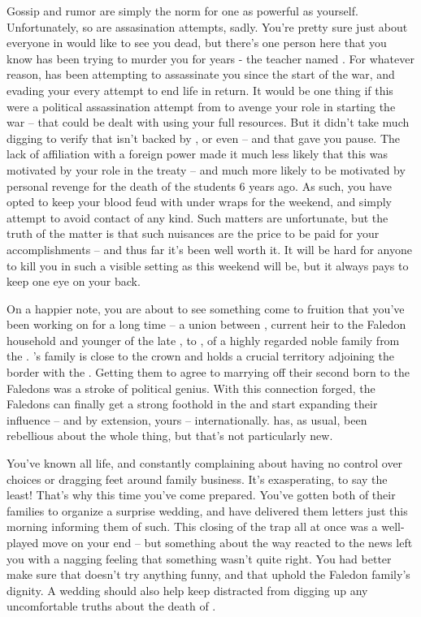\documentclass[char]{GL2020}
\begin{document}
Gossip and rumor are simply the norm for one as powerful as yourself. Unfortunately, so are assasination attempts, sadly. You’re pretty sure just about everyone in \pShip{} would like to see you dead, but there’s one person here that you know has been trying to murder you for years - the teacher named \cChupAvenger{}. For whatever reason, \cChupAvenger{} has been attempting to assassinate you since the start of the war, and evading your every attempt to end \cChupAvenger{\their} life in return. It would be one thing if this were a political assassination attempt from \pShip{} to avenge your role in starting the war -- that could be dealt with using your full resources. But it didn’t take much digging to verify that \cChupAvenger{} isn’t backed by \pShip{}, or even \pFarm{} -- and that gave you pause. The lack of affiliation with a foreign power made it much less likely that this was motivated by your role in the treaty -- and much more likely to be motivated by personal revenge for the death of the students 6 years ago. As such, you have opted to keep your blood feud with \cChupAvenger{} under wraps for the weekend, and simply attempt to avoid contact of any kind. Such matters are unfortunate, but the truth of the matter is that such nuisances are the price to be paid for your accomplishments -- and thus far it’s been well worth it. It will be hard for anyone to kill you in such a visible setting as this weekend will be, but it always pays to keep one eye on your back. 

On a happier note, you are about to see something come to fruition that you’ve been working on for a long time -- a union between \cHeir{}, current heir to the Faledon household and younger \cHeir{\sibling} of the late \cHeirSibling{}, to \cChupStudent{}, \cChupStudent{\child} of a highly regarded noble family from the \pFarm{}. \cChupStudent{}’s family is close to the crown and holds a crucial territory adjoining the border with the \pTech{}. Getting them to agree to marrying off their second born \cChupStudent{\child} to the Faledons was a stroke of political genius. With this connection forged, the Faledons can finally get a strong foothold in the \pFarm{} and start expanding their influence -- and by extension, yours -- internationally. \cHeir{} has, as usual, been rebellious about the whole thing, but that’s not particularly new. 

You’ve known \cHeir{\them} all \cHeir{\their} life, and \cHeir{\they} \cHeir{\are} constantly complaining about having no control over \cHeir{\their} choices or dragging \cHeir{\their} feet around family business. It’s exasperating, to say the least! That’s why this time you’ve come prepared. You’ve gotten both of their families to organize a surprise wedding, and have delivered them letters just this morning informing them of such. This closing of the trap all at once was a well-played move on your end -- but something about the way \cHeir{} reacted to the news left you with a nagging feeling that something wasn’t quite right. You had better make sure that \cHeir{} doesn’t try anything funny, and that \cHeir{\they} uphold the Faledon family’s dignity.  A wedding should also help keep \cHeir{} distracted from digging up any uncomfortable truths about the death of \cHeirSibling{}.
\end{document}
